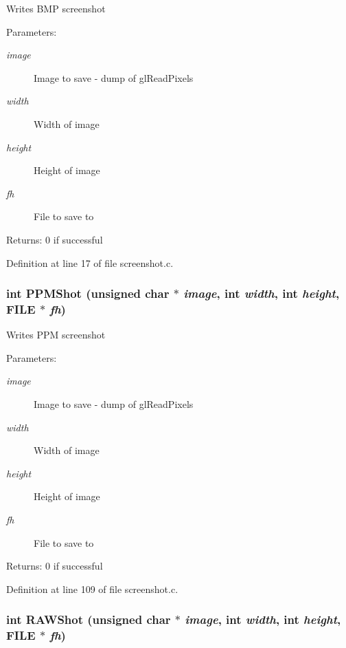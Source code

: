 Writes BMP screenshot \begin{Desc}
\item[Parameters:]
\begin{description}
\item[{\em image}]Image to save - dump of gl\-Read\-Pixels \item[{\em width}]Width of image \item[{\em height}]Height of image \item[{\em fh}]File to save to \end{description}
\end{Desc}
\begin{Desc}
\item[Returns:]0 if successful \end{Desc}


Definition at line 17 of file screenshot.c.
\subsubsection{\setlength{\rightskip}{0pt plus 5cm}int PPMShot (unsigned char $\ast$ {\em image}, int {\em width}, int {\em height}, FILE $\ast$ {\em fh})}\label{screenshot_8h_a7}


Writes PPM screenshot \begin{Desc}
\item[Parameters:]
\begin{description}
\item[{\em image}]Image to save - dump of gl\-Read\-Pixels \item[{\em width}]Width of image \item[{\em height}]Height of image \item[{\em fh}]File to save to \end{description}
\end{Desc}
\begin{Desc}
\item[Returns:]0 if successful \end{Desc}


Definition at line 109 of file screenshot.c.
\subsubsection{\setlength{\rightskip}{0pt plus 5cm}int RAWShot (unsigned char $\ast$ {\em image}, int {\em width}, int {\em height}, FILE $\ast$ {\em fh})}\label{screenshot_8h_a8}


